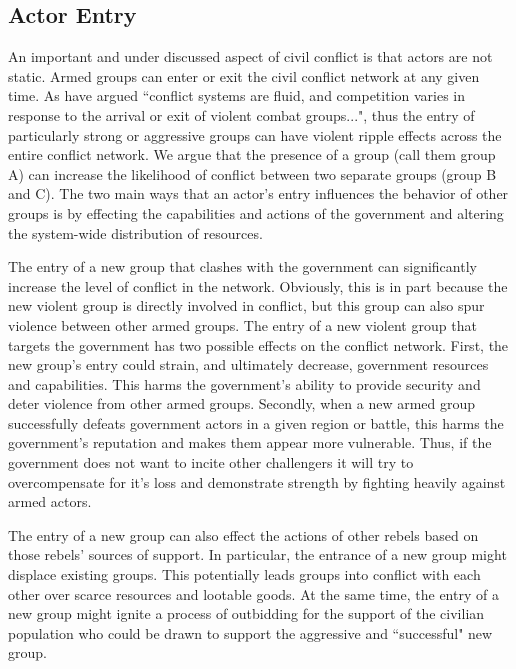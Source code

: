 \subsection{Actor Entry}
An important and under discussed aspect of civil conflict is that actors are not static. Armed groups can enter or exit the civil conflict network at any given time. As \citet[p. 168]{kathman:wood:2015} have argued ``conflict systems are fluid, and competition varies in response to the arrival or exit of violent combat groups...", thus the entry of particularly strong or aggressive groups can have violent ripple effects across the entire conflict network. We argue that the presence of a group (call them group A) can increase the likelihood of conflict between two separate groups (group B and C). The two main ways that an actor's entry influences the behavior of other groups is by effecting the capabilities and actions of the government and altering the system-wide distribution of resources. 

The entry of a new group that clashes with the government can significantly increase the level of conflict in the network. Obviously, this is in part because the new violent group is directly involved in conflict, but this group can also spur violence between other armed groups. The entry of a new violent group that targets the government has two possible effects on the conflict network. First, the new group's entry could strain, and ultimately decrease,  government resources and capabilities. This harms the government's ability to provide security and deter violence from other armed groups. Secondly, when a new armed group successfully defeats government actors in a given region or battle, this harms the government's reputation and makes them appear more vulnerable. Thus, if the government does not want to incite other challengers \citep{walter:2006} it will try to overcompensate for it's loss and demonstrate strength by fighting heavily against armed actors. %

The entry of a new group can also effect the actions of other rebels based on those rebels' sources of support. In particular, the entrance of a new group might displace existing groups. This potentially leads groups into conflict with each other over scarce resources and lootable goods. At the same time, the entry of a new group might ignite a process of outbidding for the support of the civilian population who could be drawn to support the aggressive and ``successful" new group. 


